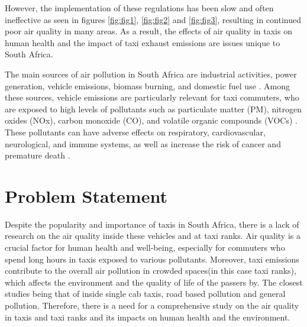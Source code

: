 \noindent
However, the implementation of these regulations has been slow and often ineffective as seen in figures \ref{fig:fig1}, \ref{fig:fig2} and \ref{fig:fig3}, resulting in continued poor air quality in many areas.
As a result, the effects of air quality in taxis on human health and the impact of taxi exhaust emissions are issues unique to South Africa.

\noindent
The main sources of air pollution in South Africa are industrial activities, power generation, vehicle emissions, biomass burning, and domestic fuel use \cite{Bylaws2023}. Among these sources, vehicle emissions are particularly relevant for taxi commuters, who are exposed to high levels of pollutants such as particulate matter (PM), nitrogen oxides (NOx), carbon monoxide (CO), and volatile organic compounds (VOCs) \cite{Venter2018}. These pollutants can have adverse effects on respiratory, cardiovascular, neurological, and immune systems, as well as increase the risk of cancer and premature death \cite{WHO2016}.


\section{Problem Statement}
Despite the popularity and importance of taxis in South Africa, there is a lack of research on the air quality inside these vehicles and at taxi ranks. 
Air quality is a crucial factor for human health and well-being, especially for commuters who spend long hours in taxis exposed to various pollutants.
Moreover, taxi emissions contribute to the overall air pollution in crowded spaces(in this case taxi ranks), which affects the environment and the quality of life of the passers by. The closest studies being that of inside single cab taxis\cite{insidetaxismall}, road based pollution\cite{taxiNetwork} and general pollution\cite{Environmentalimpact}.
Therefore, there is a need for a comprehensive study on the air quality in taxis and taxi ranks and its impacts on human health and the environment.

